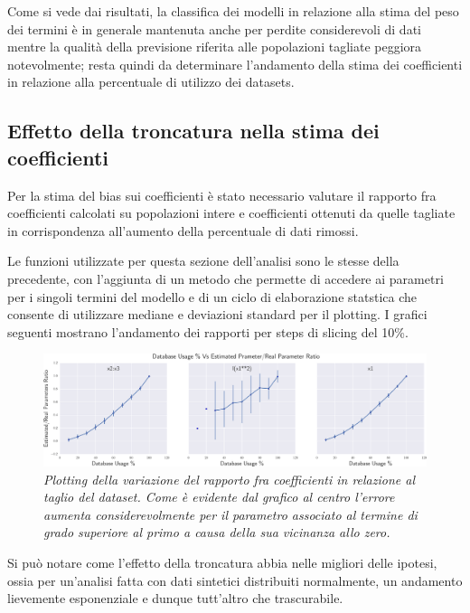 \documentclass[12pt,openright,twoside,a4paper]{book}
\begin{document}
Come si vede dai risultati, la classifica dei modelli in relazione alla stima del peso dei termini è in generale mantenuta anche per perdite considerevoli di dati mentre la qualità della previsione riferita alle popolazioni tagliate peggiora notevolmente; resta quindi da determinare l'andamento della stima dei coefficienti in relazione alla percentuale di utilizzo dei datasets.


\subsection{Effetto della troncatura nella stima dei coefficienti }

Per la stima del bias sui coefficienti è stato necessario valutare il rapporto fra coefficienti calcolati su popolazioni intere e coefficienti ottenuti da quelle  tagliate in corrispondenza all'aumento della percentuale di dati rimossi.

 Le funzioni utilizzate per questa sezione dell'analisi sono le stesse della precedente, con l'aggiunta di un metodo che permette di accedere ai parametri per i singoli termini del modello e di un ciclo di elaborazione statstica che consente  di utilizzare mediane e deviazioni standard per il plotting.
I grafici seguenti mostrano l'andamento dei rapporti per steps di slicing del 10\%.

\begin{figure}[!h]
\centering
\includegraphics[width=1.0\linewidth]{finalgraph}
\caption{\textit{Plotting della variazione del rapporto fra coefficienti in relazione al taglio del dataset. Come è evidente dal grafico al centro l'errore aumenta considerevolmente per il parametro associato al termine di grado superiore al primo a causa della sua vicinanza allo zero.}}
\label{finalgraph}
\end{figure}


Si può notare come l'effetto della troncatura abbia nelle migliori delle ipotesi, ossia per un'analisi fatta con dati sintetici distribuiti normalmente, un andamento lievemente esponenziale e dunque tutt'altro che trascurabile.
\end{document}
